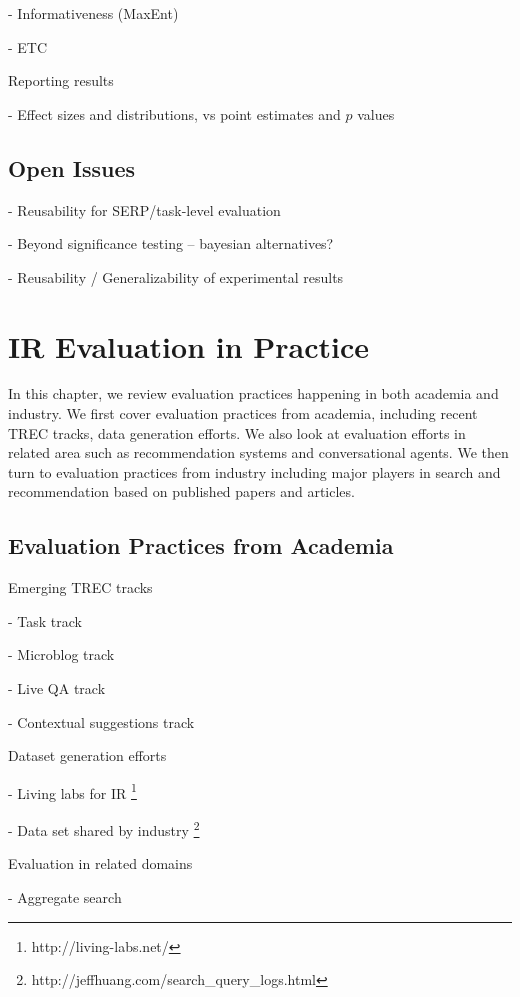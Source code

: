 \documentclass[openany]{now} %
\newcommand{\newpar}{\bigskip\noindent}
\begin{document}
- Informativeness (MaxEnt) \cite{AslamYP05}

- ETC \cite{Bron:2013} \cite{Boytsov:2013}  \cite{Robertson:2012}

\newpar
Reporting results

- Effect sizes and distributions, vs point estimates and $p$ values

\section{Open Issues}

- Reusability for SERP/task-level evaluation

- Beyond significance testing -- bayesian alternatives?

- Reusability / Generalizability of experimental results


\chapter{IR Evaluation in Practice}

In this chapter, we review evaluation practices happening in both academia and industry. We first cover evaluation practices from academia, including recent TREC tracks, data generation efforts. We also look at evaluation efforts in related area such as recommendation systems and conversational agents. We then turn to evaluation practices from industry including major players in search and recommendation based on published papers and articles.

\section{Evaluation Practices from Academia}

Emerging TREC tracks

- Task track

- Microblog track

- Live QA track

- Contextual suggestions track

\newpar
Dataset generation efforts

- Living labs for IR \footnote{http://living-labs.net/}

- Data set shared by industry \footnote{http://jeffhuang.com/search\_query\_logs.html}

\newpar
Evaluation in related domains

- Aggregate search \cite{Zhou:2013}
\end{document}
